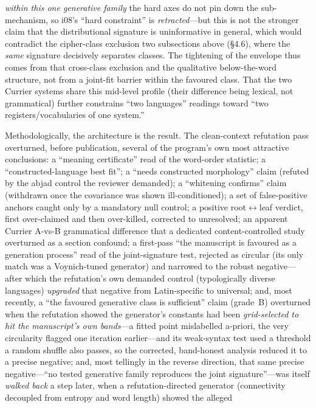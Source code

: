 \documentclass[11pt]{article}
\begin{document}
\emph{within this one generative family} the hard axes do not pin down the sub-mechanism, so
i08's ``hard constraint'' is \emph{retracted}---but this is not the stronger claim that the
distributional signature is uninformative in general, which would contradict the
cipher-class exclusion two subsections above (\S4.6), where the \emph{same} signature
decisively separates classes. The tightening of the envelope thus comes from that
cross-class exclusion and the qualitative below-the-word structure, not from a joint-fit
barrier within the favoured class. That the two Currier systems share this mid-level profile
(their difference being lexical, not grammatical) further constrains ``two languages''
readings toward ``two registers/vocabularies of one system.''

Methodologically, the architecture is the result. The clean-context refutation pass
overturned, before publication, several of the program's own most attractive
conclusions: a ``meaning certificate'' read of the word-order statistic; a
``constructed-language best fit''; a ``needs constructed morphology'' claim (refuted by
the abjad control the reviewer demanded); a ``whitening confirms'' claim (withdrawn
once the covariance was shown ill-conditioned); a set of false-positive anchors caught
only by a mandatory null control; a positive root$\leftrightarrow$leaf verdict, first
over-claimed and then over-killed, corrected to unresolved; an apparent Currier
A-vs-B grammatical difference that a dedicated content-controlled study overturned as a
section confound; a first-pass ``the manuscript is favoured as a
generation process'' read of the joint-signature test, rejected as circular (its only
match was a Voynich-tuned generator) and narrowed to the robust negative---after which
the refutation's own demanded control (typologically diverse languages) \emph{upgraded}
that negative from Latin-specific to universal; and, most recently, a ``the favoured
generative class is sufficient'' claim (grade~B) overturned when the refutation showed the
generator's constants had been \emph{grid-selected to hit the manuscript's own bands}---a
fitted point mislabelled a-priori, the very circularity flagged one iteration earlier---and
its weak-syntax test used a threshold a random shuffle also passes, so the corrected,
band-honest analysis reduced it to a precise negative; and, most tellingly in the reverse
direction, that same precise negative---``no tested generative family reproduces the joint
signature''---was itself \emph{walked back} a step later, when a refutation-directed
generator (connectivity decoupled from entropy and word length) showed the alleged
\end{document}
